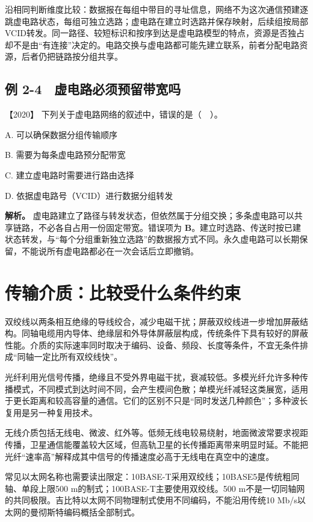 沿相同判断维度比较：数据报在每组中带目的寻址信息，网络不为这次通信预建逐跳虚电路状态，每组可独立选路；虚电路在建立时选路并保存映射，后续组按局部VCID转发。同一路径、较短标识和按序到达是虚电路模型的特点，资源是否独占却不是由``有连接''决定的。电路交换与虚电路都可能先建立联系，前者分配电路资源，后者仍把链路按分组共享。

\subsection{例 2-4　虚电路必须预留带宽吗}\label{cn-ex2-4}

\noindent{}【2020】 下列关于虚电路网络的叙述中，错误的是（　）。

A. 可以确保数据分组传输顺序

B. 需要为每条虚电路预分配带宽

C. 建立虚电路时需要进行路由选择

D. 依据虚电路号（VCID）进行数据分组转发


\textbf{解析。} 虚电路建立了路径与转发状态，但依然属于分组交换；多条虚电路可以共享链路，不必各自占用一份固定带宽。错误项为 \textbf{B}。建立时选路、传送时按已建状态转发，与``每个分组重新独立选路''的数据报方式不同。永久虚电路可以长期保留，不能说所有虚电路都必在一次会话后立即撤销。

\section{传输介质：比较受什么条件约束}\label{cn-02-06}

双绞线以两条相互绝缘的导线绞合，减少电磁干扰；屏蔽双绞线进一步增加屏蔽结构。同轴电缆用内导体、绝缘层和外导体屏蔽层构成，传统条件下具有较好的屏蔽性能。介质的实际速率同时取决于编码、设备、频段、长度等条件，不宜无条件排成``同轴一定比所有双绞线快''。

光纤利用光信号传播，绝缘且不受外界电磁干扰，衰减较低。多模光纤允许多种传播模式，不同模式到达时间不同，会产生模间色散；单模光纤减轻这类展宽，适用于更长距离和较高容量的通信。它们的区别不只是``同时发送几种颜色''；多种波长复用是另一种复用技术。

无线介质包括无线电、微波、红外等。低频无线电较易绕射，地面微波常要求视距传播，卫星通信能覆盖较大区域，但高轨卫星的长传播距离带来明显时延。不能把光纤``速率高''解释成其中信号的传播速度必高于无线电在真空中的速度。

常见以太网名称也需要读出限定：10BASE-T采用双绞线；10BASE5是传统粗同轴、单段上限500 m的制式；100BASE-T主要使用双绞线。500 m不是一切同轴网的共同极限。吉比特以太网不同物理制式使用不同编码，不能沿用传统10 Mb/s以太网的曼彻斯特编码概括全部制式。

